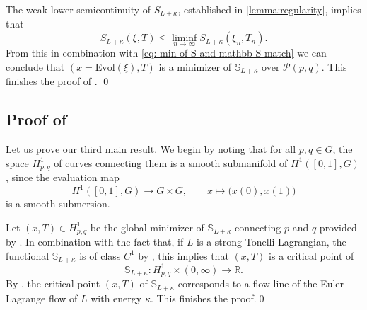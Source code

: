 \documentclass[11pt,reqno]{amsart}
\theoremstyle{plain}
\theoremstyle{definition}
\theoremstyle{plain} %
\theoremstyle{definition} %
\numberwithin{equation}{section}
\def\k{\kappa}
\def\k{\kappa}
\begin{document}
The weak lower semicontinuity of \( S_{L + \kappa} \), established in \cref{lemma:regularity}, implies that
\[
    S_{L+\k}(\xi,T)\leq \liminf_{n \to \infty} S_{L+\k}(\xi_n, T_n).
\]
From this in combination with \eqref{eq: min of S and mathbb S match}  we can conclude that $(x=\mathrm{Evol}(\xi),T)$ is a minimizer of $\mathbb S_{L+\kappa}$ over $\mathcal P(p, q)$. This finishes the proof of . \qed

\subsection{Proof of } Let us prove our third main result. 
We begin by noting that for all \( p, q \in G \), the space \( H^1_{p, q} \) of curves connecting them is a smooth submanifold of \( H^1([0, 1], G) \), since the evaluation map
\begin{equation}
    H^1([0, 1], G) \to G \times G, \qquad x \mapsto \big( x(0), x(1) \big)
\end{equation}
is a smooth submersion.

Let \( (x, T) \in H^1_{p,q} \) be the global minimizer of \( \mathbb{S}_{L+\kappa} \) connecting \( p \) and \( q \) provided by . In combination with the fact that, if \( L \) is a strong Tonelli Lagrangian, the functional \( \mathbb{S}_{L+\kappa} \) is of class \( C^1 \) by , this implies that \( (x, T) \) is a critical point of
\[
    \mathbb{S}_{L+\kappa} \colon H^1_{p,q} \times (0, \infty) \longrightarrow \mathbb{R}.
\]
By , the critical point \( (x, T) \) of \( \mathbb{S}_{L+\kappa} \) corresponds to a flow line of the Euler--Lagrange flow of \( L \) with energy \( \kappa \). This finishes the proof.\qed


\appendix
\end{document}
